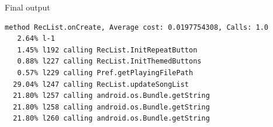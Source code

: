 \begin{frame}[fragile]{Final output}
\centering
{\tiny%
\begin{lstlisting}
method RecList.onCreate, Average cost: 0.0197754308, Calls: 1.0
   2.64% l-1
   1.45% l192 calling RecList.InitRepeatButton
   0.88% l227 calling RecList.InitThemedButtons
   0.57% l229 calling Pref.getPlayingFilePath
  29.04% l247 calling RecList.updateSongList
  21.80% l257 calling android.os.Bundle.getString
  21.80% l258 calling android.os.Bundle.getString
  21.80% l260 calling android.os.Bundle.getString
\end{lstlisting}}
\end{frame}
%
%
